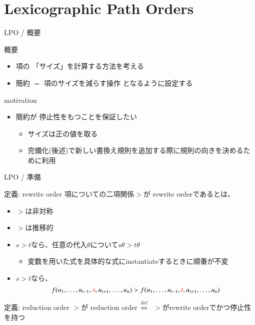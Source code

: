 \documentclass[dvipdfmx,11pt,notheorems]{beamer}
\theoremstyle{definition}
\newcommand{\red}[1]{{\color{red} #1}}
\newcommand{\defines}{\ensuremath{\overset{\text{def}}{\,\Longleftrightarrow\,}}}
\begin{document}
\section{Lexicographic Path Orders}
\begin{frame}{LPO / 概要}
  \begin{block}{概要}
    \begin{itemize}
      \item 項の\red{「サイズ」}を計算する方法を考える
      \item \red{簡約 $=$ 項のサイズを減らす操作} となるように設定する
    \end{itemize}
  \end{block}

  \begin{block}{motivation}
    \begin{itemize}
      \item 簡約が\red{停止性}をもつことを保証したい
      \begin{itemize}
        \item サイズは正の値を取る
        \item 完備化(後述)で新しい書換え規則を追加する際に規則の向きを決めるために利用
      \end{itemize}
    \end{itemize}
  \end{block}
\end{frame}

\begin{frame}{LPO / 準備}
  \begin{block}{定義: rewrite order}
    項についての二項関係$>$が\red{rewrite order}であるとは、
    \begin{itemize}
      \item $>$は非対称
      \item $>$は推移的
      \item $s > t$なら、任意の代入$\theta$について$s \theta > t \theta$
      \begin{itemize}
        \item 変数を用いた式を具体的な式にinstantiateするときに順番が不変
      \end{itemize}
      \item $s > t$なら、
      \vspace{-5pt}
      \[
      f(u_1, \ldots, u_{i-1}, \red{s}, u_{i+1}, \ldots, u_{n}) >
      f(u_1, \ldots, u_{i-1}, \red{t}, u_{i+1}, \ldots, u_{n})
      \]
    \end{itemize}
  \end{block}

  \begin{block}{定義: reduction order}
    \centering
    $>$が\red{reduction order}$\defines$
    $>$がrewrite orderでかつ停止性を持つ
  \end{block}
\end{frame}
\end{document}
